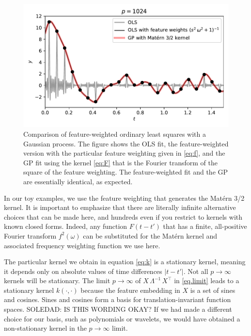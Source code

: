 \documentclass[12pt,letterpaper]{article}
\newlength{\figurewidth}
\begin{document}
\begin{figure}[t]
    \begin{mdframed}
    \includegraphics[width=\figurewidth]{paper/GP.pdf}
    \caption{Comparison of feature-weighted ordinary least squares with a Gaussian process. The figure shows the OLS fit, the feature-weighted version with the particular feature weighting given in \eqref{eq:f}, and the GP fit using the kernel \eqref{eq:F} that is the Fourier transform of the square of the feature weighting. The feature-weighted fit and the GP are essentially identical, as expected.}
    \label{fig:gp}
    \end{mdframed}
\end{figure}

In our toy examples, we use the feature weighting that generates the Mat\'ern 3/2 kernel.
It is important to emphasize that there are literally infinite alternative choices that can be made here, and hundreds even if you restrict to kernels with known closed forms.
Indeed, any function $F(t-t')$ that has a finite, all-positive Fourier transform $f^2(\omega)$ can be substituted for the Mat\'ern kernel and associated frequency weighting function we use here.

The particular kernel we obtain in equation \eqref{eq:k} is a stationary kernel, meaning it depends only on absolute values of time differences $|t - t'|$. Not all $p\rightarrow\infty$ kernels will be stationary. The limit $p\rightarrow\infty$ of $X\,\Lambda^{-1}\,X^\top$ in \eqref{eq.limit} leads to a stationary kernel $k(\cdot,\cdot)$ because the feature embedding in $X$ is a set of sines and cosines.
Sines and cosines form a basis for translation-invariant function spaces. SOLEDAD: IS THIS WORDING OKAY?
If we had made a different choice for our basis, such as polynomials or wavelets, we would have obtained a non-stationary kernel in the $p\rightarrow\infty$ limit.
\end{document}
